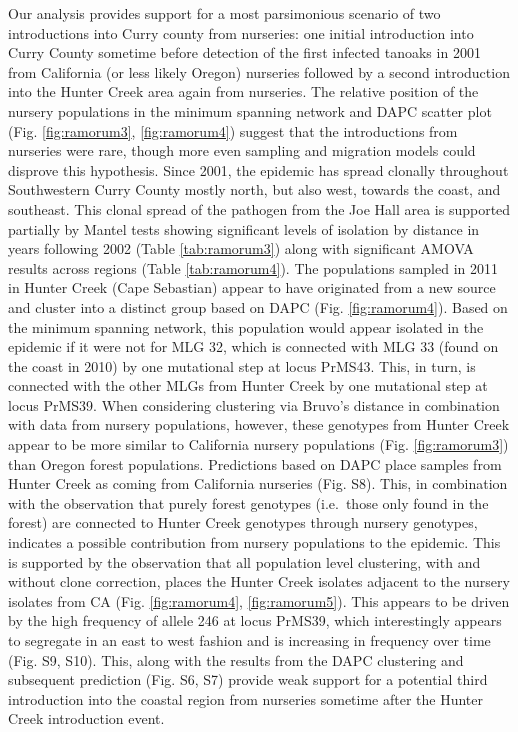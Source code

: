 \documentclass[double,12pt]{beavtex}
\begin{document}
  Our analysis provides support for a most parsimonious scenario of two
  introductions into Curry county from nurseries: one initial introduction
  into Curry County sometime before detection of the first infected
  tanoaks in 2001 from California (or less likely Oregon) nurseries
  followed by a second introduction into the Hunter Creek area again from
  nurseries. The relative position of the nursery populations in the
  minimum spanning network and DAPC scatter plot (Fig. \ref{fig:ramorum3},
  \ref{fig:ramorum4}) suggest that the introductions from nurseries were
  rare, though more even sampling and migration models could disprove this
  hypothesis. Since 2001, the epidemic has spread clonally throughout
  Southwestern Curry County mostly north, but also west, towards the
  coast, and southeast. This clonal spread of the pathogen from the Joe
  Hall area is supported partially by Mantel tests showing significant
  levels of isolation by distance in years following 2002 (Table
  \ref{tab:ramorum3}) along with significant AMOVA results across regions
  (Table \ref{tab:ramorum4}). The populations sampled in 2011 in Hunter
  Creek (Cape Sebastian) appear to have originated from a new source and
  cluster into a distinct group based on DAPC (Fig. \ref{fig:ramorum4}).
  Based on the minimum spanning network, this population would appear
  isolated in the epidemic if it were not for MLG 32, which is connected
  with MLG 33 (found on the coast in 2010) by one mutational step at locus
  PrMS43. This, in turn, is connected with the other MLGs from Hunter
  Creek by one mutational step at locus PrMS39. When considering
  clustering via Bruvo's distance in combination with data from nursery
  populations, however, these genotypes from Hunter Creek appear to be
  more similar to California nursery populations (Fig. \ref{fig:ramorum3})
  than Oregon forest populations. Predictions based on DAPC place samples
  from Hunter Creek as coming from California nurseries (Fig. S8). This,
  in combination with the observation that purely forest genotypes
  (i.e.~those only found in the forest) are connected to Hunter Creek
  genotypes through nursery genotypes, indicates a possible contribution
  from nursery populations to the epidemic. This is supported by the
  observation that all population level clustering, with and without clone
  correction, places the Hunter Creek isolates adjacent to the nursery
  isolates from CA (Fig. \ref{fig:ramorum4}, \ref{fig:ramorum5}). This
  appears to be driven by the high frequency of allele 246 at locus
  PrMS39, which interestingly appears to segregate in an east to west
  fashion and is increasing in frequency over time (Fig. S9, S10). This,
  along with the results from the DAPC clustering and subsequent
  prediction (Fig. S6, S7) provide weak support for a potential third
  introduction into the coastal region from nurseries sometime after the
  Hunter Creek introduction event.
  
\end{document}
